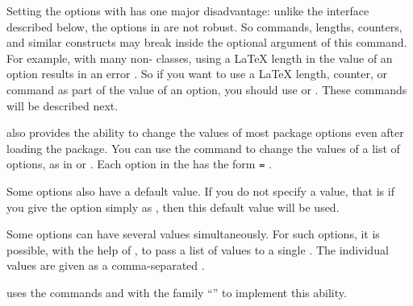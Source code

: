 Setting the options with  has one
major disadvantage: unlike the interface described below, the options in 
 are not robust. So commands, lengths, counters, and
similar constructs may break inside the optional argument of this command.
For example, with many non-\KOMAScript{} classes, using a \LaTeX{} length
in the value of an option results in an error%
%
. So if you want to use a \LaTeX{} length, counter, or command as part of the
value of an option, you should use  or
. These commands will be described next.%
%
\EndIndexGroup


\begin{Declaration}
\end{Declaration}
\KOMAScript{} also
provides the ability to change the values of most
package options
even after loading the  package. You can use the  command to change the
values of a list of options, as in
 or
. Each option in the
 has the form \texttt{=}%
.

Some options also have a default value. If you do not specify a value, that is
if you give the option simply as , then this default value will
be used.

Some options can have several values simultaneously. For such options, it is
possible, with the help of , to pass a list of values to a
single . The individual values are given as a comma-separated
.

\begin{Explain}
  \KOMAScript{} uses the commands  and
   with the family ``'' to
  implement this ability.
\end{Explain}

